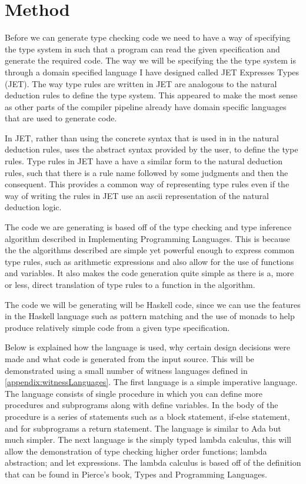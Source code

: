 \chapter{Method}
Before we can generate type checking code we need to have a way of specifying the type system in such that a program can read the given specification and generate the required code.
The way we will be specifying the the type system is through a domain specified language I have designed called JET Expresses Types (JET).
The way type rules are written in JET are analogous to the natural deduction rules to define the type system.
This appeared to make the most sense as other parts of the compiler pipeline already have domain specific languages that are used to generate code.

In JET, rather than using the concrete syntax that is used in in the natural deduction rules, uses the abstract syntax provided by the user, to define the type rules.
Type rules in JET have a have a similar form to the natural deduction rules, such that there is a rule name followed by some judgments and then the consequent.
This provides a common way of representing type rules even if the way of writing the rules in JET use an ascii representation of the natural deduction logic.

The code we are generating is based off of the type checking and type inference algorithm described in Implementing Programming Languages\cite{ranta2012implementing}.
This is because the the algorithms described are simple yet powerful enough to express common type rules, such as arithmetic expressions and also allow for the use of functions and variables.
It also makes the code generation quite simple as there is a, more or less, direct translation of type rules to a function in the algorithm.

The code we will be generating will be Haskell code, since we can use the features in the Haskell language such as pattern matching and the use of monads to help produce relatively simple code from a given type specification.

Below is explained how the language is used, why certain design decisions were made and what code is generated from the input source. 
This will be demonstrated using a small number of  witness languages defined in \autoref{appendix:witnessLanguages}.
The first language is a simple imperative language. 
The language consists of single procedure in which you can define more procedures and subprograms along with define variables. In the body of the procedure is a series of statements such as a block statement, if-else statement, and for subprograms a return statement. The language is similar to Ada but much simpler.
The next language is the simply typed lambda calculus, this will allow the demonstration of type checking higher order functions; lambda abstraction; and let expressions.
The lambda calculus is based off of the definition that can be found in Pierce's book, Types and Programming Languages\cite{pierce2002types}.





